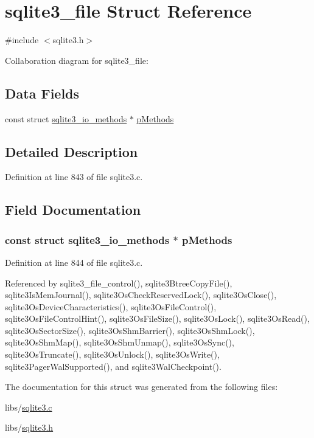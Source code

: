 \hypertarget{structsqlite3__file}{}\section{sqlite3\+\_\+file Struct Reference}
\label{structsqlite3__file}


{\ttfamily \#include $<$sqlite3.\+h$>$}



Collaboration diagram for sqlite3\+\_\+file\+:
\subsection*{Data Fields}
\begin{DoxyCompactItemize}
\item 
const struct \hyperlink{structsqlite3__io__methods}{sqlite3\+\_\+io\+\_\+methods} $\ast$ \hyperlink{structsqlite3__file_a7623c12f57a06b17ec2c2e7928f7d6d5}{p\+Methods}
\end{DoxyCompactItemize}


\subsection{Detailed Description}


Definition at line 843 of file sqlite3.\+c.



\subsection{Field Documentation}
\hypertarget{structsqlite3__file_a7623c12f57a06b17ec2c2e7928f7d6d5}{}
\subsubsection[{p\+Methods}]{\setlength{\rightskip}{0pt plus 5cm}const struct {\bf sqlite3\+\_\+io\+\_\+methods} $\ast$ p\+Methods}\label{structsqlite3__file_a7623c12f57a06b17ec2c2e7928f7d6d5}


Definition at line 844 of file sqlite3.\+c.



Referenced by sqlite3\+\_\+file\+\_\+control(), sqlite3\+Btree\+Copy\+File(), sqlite3\+Is\+Mem\+Journal(), sqlite3\+Os\+Check\+Reserved\+Lock(), sqlite3\+Os\+Close(), sqlite3\+Os\+Device\+Characteristics(), sqlite3\+Os\+File\+Control(), sqlite3\+Os\+File\+Control\+Hint(), sqlite3\+Os\+File\+Size(), sqlite3\+Os\+Lock(), sqlite3\+Os\+Read(), sqlite3\+Os\+Sector\+Size(), sqlite3\+Os\+Shm\+Barrier(), sqlite3\+Os\+Shm\+Lock(), sqlite3\+Os\+Shm\+Map(), sqlite3\+Os\+Shm\+Unmap(), sqlite3\+Os\+Sync(), sqlite3\+Os\+Truncate(), sqlite3\+Os\+Unlock(), sqlite3\+Os\+Write(), sqlite3\+Pager\+Wal\+Supported(), and sqlite3\+Wal\+Checkpoint().



The documentation for this struct was generated from the following files\+:\begin{DoxyCompactItemize}
\item 
libs/\hyperlink{sqlite3_8c}{sqlite3.\+c}\item 
libs/\hyperlink{sqlite3_8h}{sqlite3.\+h}\end{DoxyCompactItemize}
